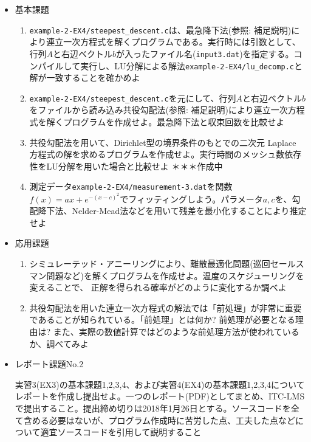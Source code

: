 \documentclass[11pt]{jarticle}
\begin{document}
\begin{itemize}
\item 基本課題
  \begin{enumerate}
  \item {\tt example-2-EX4/steepest\_descent.c}は、最急降下法(参照: 補足説明)により連立一次方程式を解くプログラムである。実行時には引数として、行列$A$と右辺ベクトル$b$が入ったファイル名({\tt input3.dat})を指定する。コンパイルして実行し、LU分解による解法{\tt example-2-EX4/lu\_decomp.c}と解が一致することを確かめよ
  \item {\tt example-2-EX4/steepest\_descent.c}を元にして、行列$A$と右辺ベクトル$b$をファイルから読み込み共役勾配法(参照: 補足説明)により連立一次方程式を解くプログラムを作成せよ。最急降下法と収束回数を比較せよ
    \item 共役勾配法を用いて、Dirichlet型の境界条件のもとでの二次元 Laplace 方程式の解を求めるプログラムを作成せよ。実行時間のメッシュ数依存性をLU分解を用いた場合と比較せよ ＊＊＊作成中
  \item 測定データ{\tt example-2-EX4/measurement-3.dat}を関数$f(x)=ax+e^{−(x−c)^2}$でフィッティングしよう。パラメータ$a, c$を、勾配降下法、Nelder-Mead法などを用いて残差を最小化することにより推定せよ
  \end{enumerate}  
\item 応用課題
  \begin{enumerate}
  \item シミュレーテッド・アニーリングにより、離散最適化問題(巡回セールスマン問題など)を解くプログラムを作成せよ。温度のスケジューリングを変えることで、
正解を得られる確率がどのように変化するか調べよ
  \item 共役勾配法を用いた連立一次方程式の解法では「前処理」が非常に重要
であることが知られている。「前処理」とは何か? 前処理が必要となる理由は? また、実際の数値計算ではどのような前処理方法が使われているか、調べてみよ
  \end{enumerate}

\item レポート課題No.2

  実習3(EX3)の基本課題1,2,3,4、および実習4(EX4)の基本課題1,2,3,4についてレポートを作成し提出せよ。一つのレポート(PDF)としてまとめ、ITC-LMSで提出すること。提出締め切りは2018年1月26日とする。ソースコードを全て含める必要はないが、プログラム作成時に苦労した点、工夫した点などについて適宜ソースコードを引用して説明すること
\end{itemize}

\clearpage

\noindent [補足説明]
\end{document}
